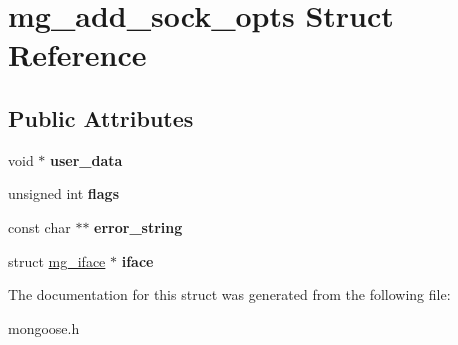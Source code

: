\hypertarget{structmg__add__sock__opts}{}\section{mg\+\_\+add\+\_\+sock\+\_\+opts Struct Reference}
\label{structmg__add__sock__opts}
\subsection*{Public Attributes}
\begin{DoxyCompactItemize}
\item 
\mbox{\label{structmg__add__sock__opts_af927a96c42e76f43592b510eca4e1f8e}} 
void $\ast$ {\bfseries user\+\_\+data}
\item 
\mbox{\label{structmg__add__sock__opts_ac836b917617be7c0a38e6a322cdf9cff}} 
unsigned int {\bfseries flags}
\item 
\mbox{\label{structmg__add__sock__opts_a13c0a3d7dc05ad3873a03a7236735a50}} 
const char $\ast$$\ast$ {\bfseries error\+\_\+string}
\item 
\mbox{\label{structmg__add__sock__opts_a3d5516f6481c9a317b4708ec370a9b43}} 
struct \hyperlink{structmg__iface}{mg\+\_\+iface} $\ast$ {\bfseries iface}
\end{DoxyCompactItemize}


The documentation for this struct was generated from the following file\+:\begin{DoxyCompactItemize}
\item 
mongoose.\+h\end{DoxyCompactItemize}
